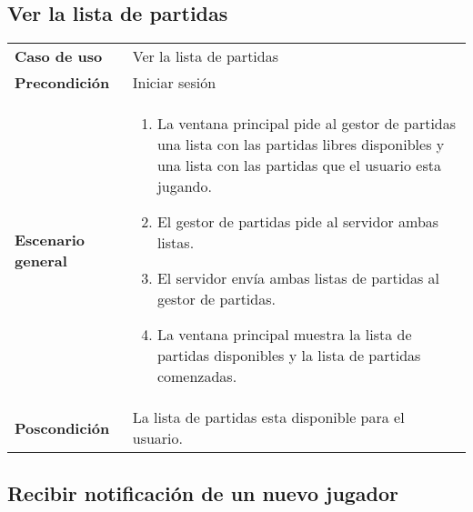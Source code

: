 \subsection{Ver la lista de partidas}

{\footnotesize
\begin{tabularx}{0.95\textwidth}{p{}|X}

\textbf{Caso de uso} & Ver la lista de partidas \\

\textbf{Precondición} & Iniciar sesión \\

\textbf{Escenario general} & \begin{enumerate}
\item La ventana principal pide al gestor de partidas una lista con las
partidas libres disponibles y una lista con las partidas que el usuario esta
jugando.
\item El gestor de partidas pide al servidor ambas listas.
\item El servidor envía ambas listas de partidas al gestor de partidas.
\item La ventana principal muestra la lista de partidas disponibles y la lista
de partidas comenzadas.

\end{enumerate} \\

\textbf{Poscondición} & La lista de partidas esta disponible para el usuario.

\end{tabularx}
}

\subsection{Recibir notificación de un nuevo jugador}

